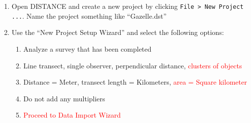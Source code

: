 \documentclass[12pt]{article}
\begin{document}
\begin{enumerate}
\item Open DISTANCE and create a new project by clicking
  \verb+File > New Project ...+. Name the project something like
  ``Gazelle.dst''  
    
  \item Use the ``New Project Setup Wizard'' and select the
    following options: 
  \begin{enumerate}
    \item Analyze a survey that has been completed
    \item Line transect, single observer, perpendicular distance,
      \textcolor{red}{clusters of objects} 
    \item Distance = Meter, transect length = Kilometers,
      \textcolor{red}{area = Square kilometer}
    \item Do not add any multipliers
    \item \textcolor{red}{Proceed to Data Import Wizard}
  \end{enumerate}



\end{enumerate}
\end{document}

